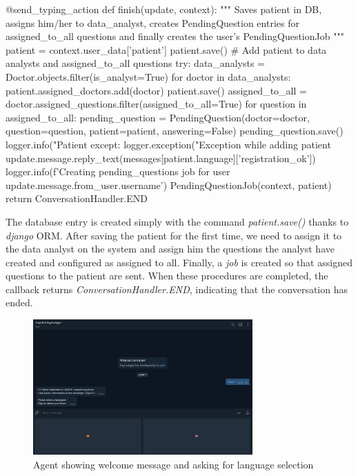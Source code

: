 \documentclass[12pt,english]{article}
\begin{document}
\begin{python}[caption={Patient saver callback}, captionpos=b]
  @send_typing_action
  def finish(update, context):
      """
      Saves patient in DB, assigns him/her to data_analyst, creates PendingQuestion entries for assigned_to_all questions and finally creates the user's PendingQuestionJob
      """
      patient = context.user_data['patient']
      patient.save()
      # Add patient to data analysts and assigned_to_all questions
      try:
          data_analysts = Doctor.objects.filter(is_analyst=True)
          for doctor in data_analysts:
              patient.assigned_doctors.add(doctor)
              patient.save()
              assigned_to_all = doctor.assigned_questions.filter(assigned_to_all=True)
              for question in assigned_to_all:
                  pending_question = PendingQuestion(doctor=doctor, question=question, patient=patient, answering=False)
                  pending_question.save()
          logger.info("Patient %
      except:
          logger.exception("Exception while adding patient %
      update.message.reply_text(messages[patient.language]['registration_ok'])
      logger.info(f'Creating pending_questions job for user {update.message.from_user.username}')
      PendingQuestionJob(context, patient)
      return ConversationHandler.END
\end{python}

The database entry is created simply with the command \emph{patient.save()} thanks to \emph{django} ORM. After saving the patient for the first time, we need to assign it to the data analyst on the system and assign him the questions the analyst have created and configured as assigned to all. Finally, a \emph{job} is created so that assigned questions to the patient are sent. When these procedures are completed, the callback returns \emph{ConversationHandler.END}, indicating that the conversation has ended.

\begin{figure}[H]
  \centering
  \includegraphics[width=0.75\textwidth]{start.png}
  \caption{Agent showing welcome message and asking for language selection}
\end{figure}
\end{document}
